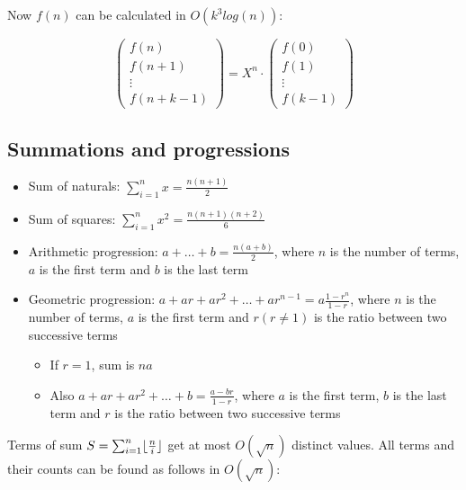 \documentclass{article}
\DeclarePairedDelimiter\floor{\lfloor}{\rfloor} %
\begin{document}
Now $f(n)$ can be calculated in $O(k^3 log(n))$:

\[
	\begin{pmatrix}
		f(n) \\
		f(n+1) \\
		\vdots \\
		f(n+k-1)
	\end{pmatrix}
	= X^n \cdot
	\begin{pmatrix}
		f(0) \\
		f(1) \\
		\vdots \\
		f(k-1)
	\end{pmatrix}
\]



\subsection {Summations and progressions}

\begin{itemize}

	\item Sum of naturals: $\sum_{i=1}^{n} x = \frac{n(n+1)}{2}$
	\item Sum of squares: $\sum_{i=1}^{n} x^2 = \frac{n(n+1)(n+2)}{6}$
	\item Arithmetic progression: $a + \dots + b = \frac{n(a+b)}{2}$, where $n$ is the number of terms, $a$ is the first term and $b$ is the last term
	\item Geometric progression: $a + ar + ar^2 + \dots + ar^{n-1} = a \frac{1-r^n}{1-r}$, where $n$ is the number of terms, $a$ is the first term and $r (r \neq 1)$ is the ratio between two successive terms
	\begin{itemize}
		\item If $r = 1$, sum is $na$
		\item Also $a + ar + ar^2 + \dots + b = \frac{a-br}{1-r}$, where $a$ is the first term, $b$ is the last term and $r$ is the ratio between two successive terms
	\end{itemize}

\end{itemize}

Terms of sum $S = \sum_{i=1}^{n} \floor{\frac{n}{i}}$ get at most $O(\sqrt{n})$ distinct values. All terms and their counts can be found as follows in $O(\sqrt{n})$:


\end{document}
